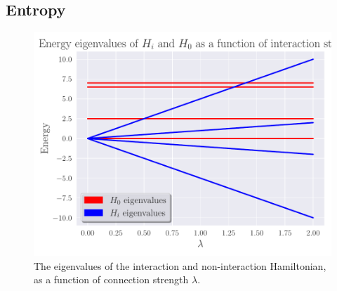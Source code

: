 \subsection{Entropy}
\begin{figure}
    \centering
    \includegraphics[width=\linewidth]{figs/Eig_lmd.pdf}
    \caption{The eigenvalues of the interaction and non-interaction Hamiltonian, as a function of connection strength $\lambda$.}
    \label{fig:eig_lmd}
\end{figure}
